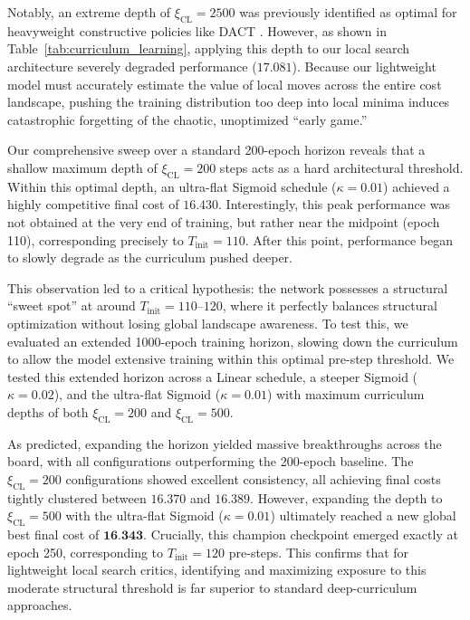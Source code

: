 \documentclass[letterpaper]{article} %
\begin{document}
Notably, an extreme depth of $\xi_{\text{CL}} = 2500$ was previously identified as optimal for heavyweight constructive policies like DACT \citep{ma_learning_2021}. However, as shown in Table~\ref{tab:curriculum_learning}, applying this depth to our local search architecture severely degraded performance ($17.081$). Because our lightweight model must accurately estimate the value of local moves across the entire cost landscape, pushing the training distribution too deep into local minima induces catastrophic forgetting of the chaotic, unoptimized ``early game.'' 

Our comprehensive sweep over a standard 200-epoch horizon reveals that a shallow maximum depth of $\xi_{\text{CL}} = 200$ steps acts as a hard architectural threshold. Within this optimal depth, an ultra-flat Sigmoid schedule ($\kappa=0.01$) achieved a highly competitive final cost of $16.430$. Interestingly, this peak performance was not obtained at the very end of training, but rather near the midpoint (epoch 110), corresponding precisely to $T_{\text{init}} = 110$. After this point, performance began to slowly degrade as the curriculum pushed deeper.

This observation led to a critical hypothesis: the network possesses a structural ``sweet spot'' at around $T_{\text{init}} = 110\text{--}120$, where it perfectly balances structural optimization without losing global landscape awareness. To test this, we evaluated an extended 1000-epoch training horizon, slowing down the curriculum to allow the model extensive training within this optimal pre-step threshold. We tested this extended horizon across a Linear schedule, a steeper Sigmoid ($\kappa=0.02$), and the ultra-flat Sigmoid ($\kappa=0.01$) with maximum curriculum depths of both $\xi_{\text{CL}} = 200$ and $\xi_{\text{CL}} = 500$. 

As predicted, expanding the horizon yielded massive breakthroughs across the board, with all configurations outperforming the 200-epoch baseline. The $\xi_{\text{CL}} = 200$ configurations showed excellent consistency, all achieving final costs tightly clustered between $16.370$ and $16.389$. However, expanding the depth to $\xi_{\text{CL}} = 500$ with the ultra-flat Sigmoid ($\kappa=0.01$) ultimately reached a new global best final cost of $\textbf{16.343}$. Crucially, this champion checkpoint emerged exactly at epoch 250, corresponding to $T_{\text{init}} = 120$ pre-steps. This confirms that for lightweight local search critics, identifying and maximizing exposure to this moderate structural threshold is far superior to standard deep-curriculum approaches.
\end{document}
